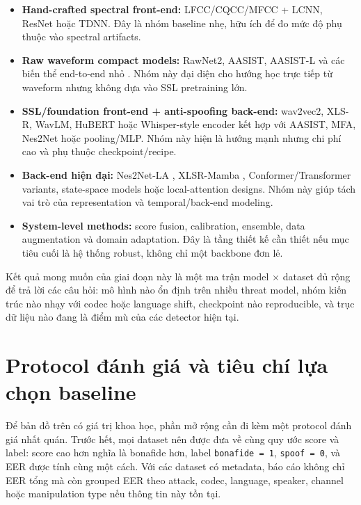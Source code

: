 \begin{itemize}
    \item \textbf{Hand-crafted spectral front-end:} LFCC/CQCC/MFCC + LCNN, ResNet hoặc TDNN. Đây là nhóm baseline nhẹ, hữu ích để đo mức độ phụ thuộc vào spectral artifacts.
    \item \textbf{Raw waveform compact models:} RawNet2, AASIST, AASIST-L và các biến thể end-to-end nhỏ \cite{rawnet2,aasist}. Nhóm này đại diện cho hướng học trực tiếp từ waveform nhưng không dựa vào SSL pretraining lớn.
    \item \textbf{SSL/foundation front-end + anti-spoofing back-end:} wav2vec2, XLS-R, WavLM, HuBERT \cite{wav2vec2,xlsr,wavlm,hubert} hoặc Whisper-style encoder \cite{whisper_aasist} kết hợp với AASIST, MFA, Nes2Net hoặc pooling/MLP. Nhóm này hiện là hướng mạnh nhưng chi phí cao và phụ thuộc checkpoint/recipe.
    \item \textbf{Back-end hiện đại:} Nes2Net-LA \cite{multiapi_spoof}, XLSR-Mamba \cite{xlsr_mamba}, Conformer/Transformer variants, state-space models hoặc local-attention designs. Nhóm này giúp tách vai trò của representation và temporal/back-end modeling.
    \item \textbf{System-level methods:} score fusion, calibration, ensemble, data augmentation và domain adaptation. Đây là tầng thiết kế cần thiết nếu mục tiêu cuối là hệ thống robust, không chỉ một backbone đơn lẻ.
\end{itemize}

Kết quả mong muốn của giai đoạn này là một ma trận model $\times$ dataset đủ rộng để trả lời các câu hỏi: mô hình nào ổn định trên nhiều threat model, nhóm kiến trúc nào nhạy với codec hoặc language shift, checkpoint nào reproducible, và trục dữ liệu nào đang là điểm mù của các detector hiện tại.

\section{Protocol đánh giá và tiêu chí lựa chọn baseline}

Để bản đồ trên có giá trị khoa học, phần mở rộng cần đi kèm một protocol đánh giá nhất quán. Trước hết, mọi dataset nên được đưa về cùng quy ước score và label: score cao hơn nghĩa là bonafide hơn, label \texttt{bonafide = 1}, \texttt{spoof = 0}, và EER được tính cùng một cách. Với các dataset có metadata, báo cáo không chỉ EER tổng mà còn grouped EER theo attack, codec, language, speaker, channel hoặc manipulation type nếu thông tin này tồn tại.

